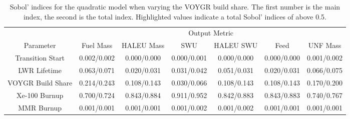 \begin{table}[h!]
    \centering
    \caption{Sobol' indices for the quadratic model when varying the VOYGR 
    build share. The first number is the main index, the second is the total 
    index. Highlighted 
    values indicate a total Sobol' indices of above 0.5.}
    \label{tab:s7_sobol_voygr_quadratic}
    \begin{tabular}{c c c c c c c}
        \hline
        & \multicolumn{6}{c}{Output Metric} \\
        Parameter & Fuel Mass & HALEU Mass & SWU & HALEU SWU & Feed & UNF Mass \\
        \hline
        Transition Start & 0.002/0.002 & 0.000/0.000 & 0.000/0.001 &
                           0.000/0.000 & 0.000/0.000 & 0.001/0.002\\
        LWR Lifetime & 0.063/0.071 & 0.020/0.031 & 0.031/0.042 &
                       0.051/0.031 & 0.020/0.031 & 0.066/0.075\\
        VOYGR Build Share & 0.214/0.243 & 0.108/0.143 & 0.030/0.066 &
                            0.108/0.143 & 0.108/0.143 & 0.170/0.200\\
        Xe-100 Burnup & \cellcolor{green!25}0.700/0.724 & \cellcolor{green!25}0.843/0.884 & \cellcolor{green!25}0.911/0.952 &
        \cellcolor{green!25}0.842/0.883 &\cellcolor{green!25} 0.843/0.883 & \cellcolor{green!25}0.740/0.767\\
        MMR Burnup & 0.001/0.001 & 0.001/0.001 & 0.001/0.002 &
                     0.001/0.002 & 0.001/0.001 & 0.001/0.001\\
        \hline        
    \end{tabular}
\end{table}

